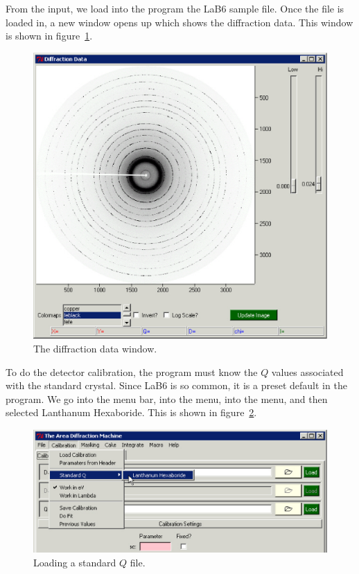 From the  input, we load into the program the LaB6 
sample file. Once the file is loaded in, a new window opens up 
which shows the diffraction data. This window is shown in 
figure~\ref{diffraction_data_window_example}.

\begin{figure}
    \centering
    \includegraphics[scale=.75]{figures/diffraction_data_window_example.eps}
    \caption{The diffraction data window.}
    \label{diffraction_data_window_example}
\end{figure}

To do the detector calibration, the program must know the 
$Q$ values associated 
with the standard crystal. Since LaB6 is so common, it is
a preset default in the program. We go into the menu bar, 
into the  menu, into the  menu, 
and then selected Lanthanum Hexaboride. This is shown
in figure~\ref{standard_q_example}.

\begin{figure}
    \centering
    \includegraphics[scale=.75]{figures/standard_q.eps}
    \caption{Loading a standard $Q$ file.}
    \label{standard_q_example}
\end{figure}

